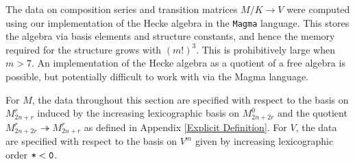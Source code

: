 \documentclass{amsart}
\begin{document}
\begin{remark}
  The data on composition series and transition matrices $M/K \rightarrow V$ were computed using our implementation \cite{Github} of the Hecke algebra in the \texttt{Magma} language.
  This stores the algebra via basis elements and structure constants, and hence the memory required for the structure grows with $(m!)^3$.
  This is prohibitively large when $m > 7$.
  An implementation of the Hecke algebra as a quotient of a free algebra is possible, but potentially difficult to work with via the Magma language.
\end{remark}

For $M$, the data throughout this section are specified with respect to the basis on $M_{2n + r}^r$ induced by the increasing lexicographic basis on $M_{2n + 2r}^0$ and the quotient $M_{2n + 2r}^r \twoheadrightarrow M_{2n + r}^r$ as defined in Appendix \ref{Explicit Definition}.
For $V$, the data are specified with respect to the basis on $V^m$ given by increasing lexicographic order $\texttt{*} < \texttt{0}$.
\end{document}
